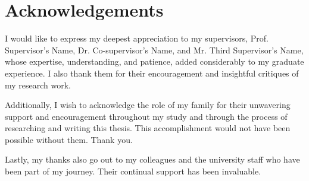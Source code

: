 \chapter*{Acknowledgements}

I would like to express my deepest appreciation to my supervisors, Prof. Supervisor's Name, Dr. Co-supervisor's Name, and Mr. Third Supervisor's Name, whose expertise, understanding, and patience, added considerably to my graduate experience. I also thank them for their encouragement and insightful critiques of my research work.

Additionally, I wish to acknowledge the role of my family for their unwavering support and encouragement throughout my study and through the process of researching and writing this thesis. This accomplishment would not have been possible without them. Thank you.

Lastly, my thanks also go out to my colleagues and the university staff who have been part of my journey. Their continual support has been invaluable.
